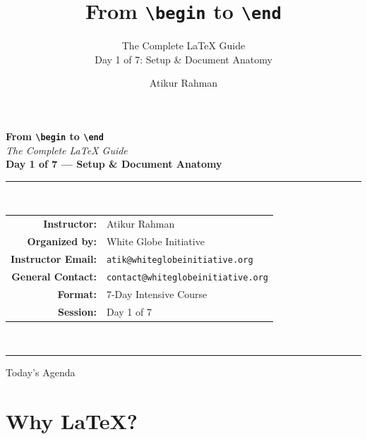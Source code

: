 \documentclass[11pt,aspectratio=169]{beamer}
\title[\texttt{\textbackslash begin} to \texttt{\textbackslash end}]{From \texttt{\textbackslash begin} to \texttt{\textbackslash end}}
\subtitle{The Complete LaTeX Guide \\[2pt] \normalsize Day 1 of 7: Setup \& Document Anatomy}
\author[A.\ Rahman]{Atikur Rahman}
\institute[White Globe Initiative]{White Globe Initiative}
\begin{document}
\begin{frame}[plain]
  \begin{center}
    \vspace{4pt}
    {\Huge\bfseries{}From \texttt{\textbackslash begin} to \texttt{\textbackslash end}}\\[6pt]
    {\Large\itshape The Complete LaTeX Guide}\\[18pt]
    {\large\bfseries Day 1 of 7 --- Setup \& Document Anatomy}\\[22pt]
    \rule{0.7\textwidth}{0.4pt}\\[14pt]
    \begin{tabular}{rl}
      \textbf{Instructor:}       & Atikur Rahman \\[3pt]
      \textbf{Organized by:}     & White Globe Initiative \\[3pt]
      \textbf{Instructor Email:} & \texttt{atik@whiteglobeinitiative.org} \\[3pt]
      \textbf{General Contact:}  & \texttt{contact@whiteglobeinitiative.org} \\[3pt]
      \textbf{Format:}           & 7-Day Intensive Course \\[3pt]
      \textbf{Session:}          & Day 1 of 7 \\
    \end{tabular}\\[18pt]
    \rule{0.7\textwidth}{0.4pt}
  \end{center}
\end{frame}

\begin{frame}{Today's Agenda}
  \tableofcontents
\end{frame}

\section{Why LaTeX?}
\end{document}
